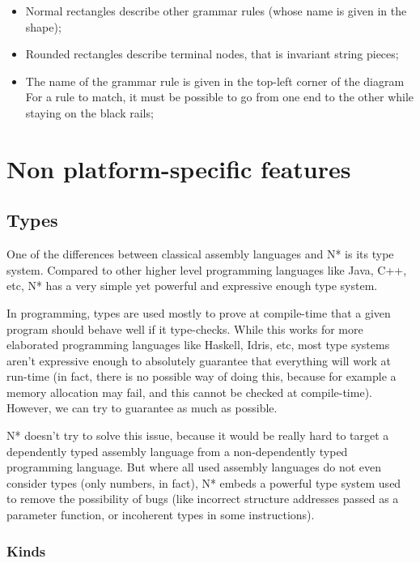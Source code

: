 \begin{itemize}
        \begin{itemize}
          \item Normal rectangles describe other grammar rules (whose name is given in the shape);
          \item Rounded rectangles describe terminal nodes, that is invariant string pieces;
          \item The name of the grammar rule is given in the top-left corner of the diagram
                For a rule to match, it must be possible to go from one end to the other while staying on the black rails;
        \end{itemize}
\end{itemize}

\chapter{Non platform-specific features}\label{chap:nstar-common}

\section{Types}\label{sec:nstar-common-ts}

One of the differences between classical assembly languages and N* is its type system.
Compared to other higher level programming languages like Java, C++, etc, N* has a very simple yet powerful and expressive enough type system.

In programming, types are used mostly to prove at compile-time that a given program should behave well if it type-checks. While this works for more elaborated programming languages like Haskell, Idris, etc, most type systems aren't expressive enough to absolutely guarantee that everything will work at run-time (in fact, there is no possible way of doing this, because for example a memory allocation may fail, and this cannot be checked at compile-time). However, we can try to guarantee as much as possible.

N* doesn't try to solve this issue, because it would be really hard to target a dependently typed assembly language from a non-dependently typed programming language. But where all used assembly languages do not even consider types (only numbers, in fact), N* embeds a powerful type system used to remove the possibility of bugs (like incorrect structure addresses passed as a parameter function, or incoherent types in some instructions).

\subsection{Kinds}\label{subsec:nstar-common-ts-kinds}

